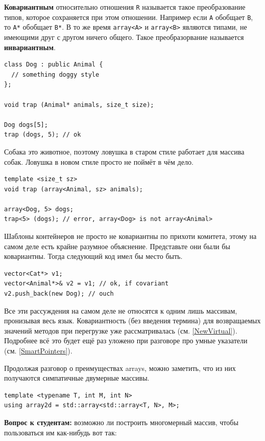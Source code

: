 \documentclass[a4paper,12pt,oneside]{book}
\begin{document}
\textbf{Ковариантным} относительно отношения \lstinline!R! называется такое преобразование типов, которое сохраняется при этом отношении. Например если \lstinline!A! обобщает \lstinline!B!, то \lstinline!A*! обобщает \lstinline!B*!. В то же время \lstinline!array<A>! и \lstinline!array<B>! являются типами, не имеющими друг с другом ничего общего. Такое преобразорвание называется \textbf{инвариантным}.

\begin{lstlisting}
class Dog : public Animal { 
  // something doggy style
};

void trap (Animal* animals, size_t size);

Dog dogs[5];
trap (dogs, 5); // ok
\end{lstlisting}

Собака это животное, поэтому ловушка в старом стиле работает для массива собак. Ловушка в новом стиле просто не поймёт в чём дело.

\begin{lstlisting}
template <size_t sz> 
void trap (array<Animal, sz> animals);

array<Dog, 5> dogs;
trap<5> (dogs); // error, array<Dog> is not array<Animal>
\end{lstlisting}

Шаблоны контейнеров не просто не ковариантны по прихоти комитета, этому на самом деле есть крайне разумное объяснение. Представьте они были бы ковариантны. Тогда следующий код имел бы место быть.

\begin{lstlisting}
vector<Cat*> v1;
vector<Animal*>& v2 = v1; // ok, if covariant
v2.push_back(new Dog); // ouch
\end{lstlisting}

Все эти рассуждения на самом деле не относятся к одним лишь массивам, пронизывая весь язык. Ковариантность (без введения термина) для возвращаемых значений методов при перегрузке уже рассматривалась (см. \ref{NewVirtual}). Подробнее всё это будет ещё раз уложено при разговоре про умные указатели (см. \ref{SmartPointers}).

Продолжая разговор о преимуществах arrays, можно заметить, что из них получаются симпатичные двумерные массивы.

\begin{lstlisting}
template <typename T, int M, int N> 
using array2d = std::array<std::array<T, N>, M>; 
\end{lstlisting}

\textbf{Вопрос к студентам:} возможно ли построить многомерный массив, чтобы пользоваться им как-нибудь вот так:
\end{document}
